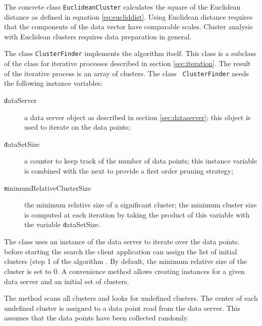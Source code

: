 
The concrete class \texttt{EuclideanCluster} calculates the square of
the Euclidean distance as defined in equation \ref{eq:eucliddist}.
Using Euclidean distance requires that the components of the data
vector have comparable scales. Cluster analysis with Euclidean
clusters requires data preparation in general.

The class \texttt{ClusterFinder} implements the algorithm itself.
This class is a subclass of the class for iterative processes
described in section \ref{sec:iteration}. The result of the
iterative process is an array of clusters. The class \texttt{
ClusterFinder} needs the following instance variables:
\begin{description}
  \item[\texttt dataServer] a data server object as described in
  section \ref{sec:dataserver}; this object is used to iterate on
  the data points;
  \item[\texttt dataSetSize] a counter to keep track of the number of
  data points; this instance variable is combined with the next to
  provide a first order pruning strategy;
  \item[\texttt minimumRelativeClusterSize] the minimum relative size
  of a significant cluster; the minimum cluster
  size is computed at each iteration by taking the product of this variable with the
  variable {\texttt dataSetSize}.
\end{description}

The class  uses an instance of the data server
to iterate over the data points. before starting the search the
client application can assign the list of initial clusters (step 1
of the algorithm . By default, the minimum relative size of the
cluster is set to 0. A convenience method allows creating
instances for a given data server and an initial set of clusters.

The method  scans all clusters and looks
for undefined clusters. The center of each undefined cluster is
assigned to a data point read from the data server. This assumes
that the data points have been collected randomly.

